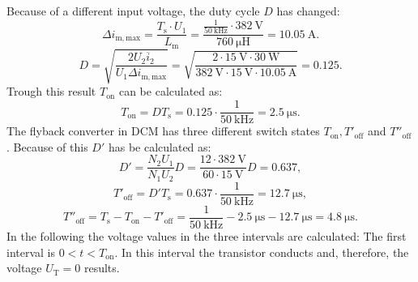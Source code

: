 
\begin{solutionblock}
    Because of a different input voltage, the duty cycle $D$ has changed:
    \begin{equation}
        \Delta i_\mathrm{m,max}= \frac{T_\mathrm{s} \cdot U_1}{L_\mathrm{m}} = \frac{\frac{1}{\SI{50}{\kilo\hertz}}\cdot \SI{382}{\volt}}{\SI{760}{\micro\henry}}=\SI{10.05}{\ampere}.
    \end{equation}
    \begin{equation}
        D = \sqrt{\frac{2U_2\overline{i}_2}{U_1\Delta i_\mathrm{m,max}}} = \sqrt{\frac{2\cdot \SI{15}{\volt}\cdot\SI{30}{\watt}}{\SI{382}{\volt}\cdot\SI{15}{\volt}\cdot\SI{10.05}{\ampere}}} = 0.125.
    \end{equation}
    Trough this result $T_\mathrm{on}$ can be calculated as:
    \begin{equation}
        T_\mathrm{on} = D T_\mathrm{s} = 0.125 \cdot \frac{1}{\SI{50}{\kilo\hertz}} = \SI {2.5}{\micro\s}.
    \end{equation}
    The flyback converter in DCM has three different switch states $T_\mathrm{on}, T'_\mathrm{off}$ and $T''_\mathrm{off}$. Because of this $D'$ has be calculated as:
    \begin{equation}
        D' = \frac{N_\mathrm{2}U_\mathrm{1}}{N_\mathrm{1}U_\mathrm{2}}D = \frac{12\cdot \SI{382}{\volt}}{60 \cdot \SI{15}{\volt}} D = 0.637,
    \end{equation}
    \begin{equation}
        T'_\mathrm{off} = D' T_\mathrm{s} = 0.637 \cdot \frac{1}{\SI{50}{\kilo\hertz}} = \SI {12.7}{\micro\s},
    \end{equation}
    \begin{equation}
        T''_\mathrm{off}= T_\mathrm{s} -T_\mathrm{on}-T'_\mathrm{off} = \frac{1}{\SI{50}{\kilo\hertz}} - \SI {2.5}{\micro\s} - \SI {12.7}{\micro\s} = \SI {4.8}{\micro\s}.
    \end{equation}
    In the following the voltage values in the three intervals are calculated:
    The first interval is $0 < t < T_\mathrm{on}$. In this interval the transistor conducts and, therefore, the voltage $U_\mathrm{T}=0$ results.

\end{solutionblock}
